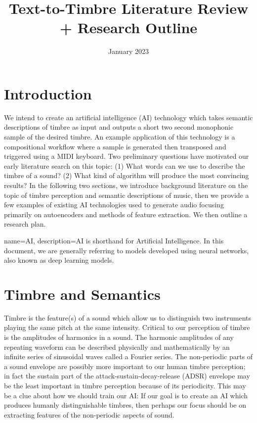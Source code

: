 \documentclass{article}
\title{Text-to-Timbre Literature Review + Research Outline }
\author{}
\date{January 2023}
\begin{document}
\maketitle

\section{Introduction}
We intend to create an artificial intelligence (\gls{AI}) technology which takes semantic descriptions of timbre as input and outputs a short two second monophonic sample of the desired timbre. An example application of this technology is a compositional workflow where a sample is generated then transposed and triggered using a MIDI keyboard. Two preliminary questions have motivated our early literature search on this topic: (1) What words can we use to describe the timbre of a sound? (2) What kind of algorithm will produce the most convincing results? In the following two sections, we introduce background literature on the topic of timbre perception and semantic descriptions of music, then we provide a few examples of existing AI technologies used to generate audio focusing primarily on autoencoders and methods of feature extraction. We then outline a research plan.

{
    name=AI,
    description={AI is shorthand for Artificial Intelligence. In this document, we are generally referring to models developed using neural networks, also known as deep learning models.}
}

\section{Timbre and Semantics}

Timbre is the feature(s) of a sound which allow us to distinguish two instruments playing the same pitch at the same intensity. Critical to our perception of timbre is the amplitudes of harmonics in a sound. The harmonic amplitudes of any repeating waveform can be described physically and mathematically by an infinite series of sinusoidal waves called a Fourier series. The non-periodic parts of a sound envelope are possibly more important to our human timbre perception; in fact the sustain part of the attack-sustain-decay-release (\gls{ADSR}) envelope may be the least important in timbre perception because of its periodicity.  \cite{Kai2019} This may be a clue about how we should train our AI: If our goal is to create an AI which produces humanly distinguishable timbres, then perhaps our focus should be on extracting features of the non-periodic aspects of sound.
\end{document}

